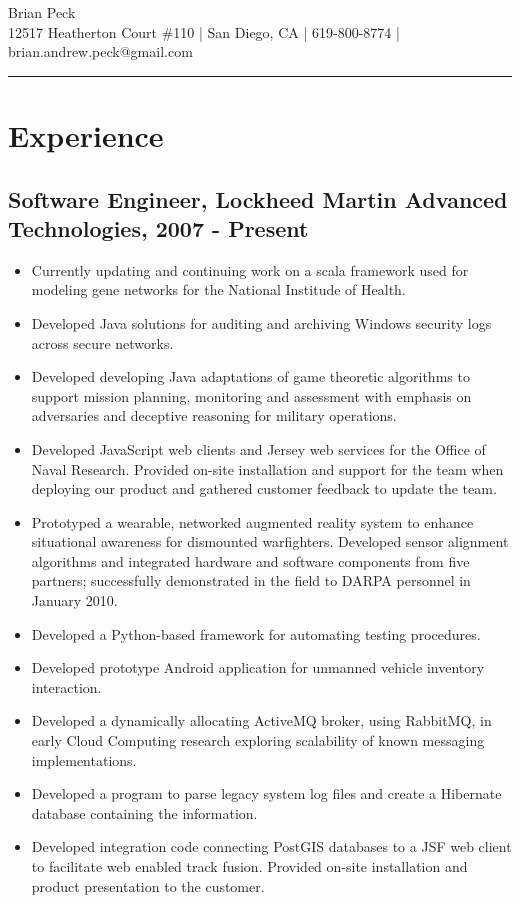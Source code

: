 \documentclass[11pt]{article}
\title{}
\date{}
\begin{document}
\begin{center}
{\huge Brian Peck} \\
12517 Heatherton Court \#110 | San Diego, CA | 619-800-8774 | brian.andrew.peck@gmail.com
\hrule
\end{center}

\section*{Experience}
\label{sec-1}

\subsection*{Software Engineer, Lockheed Martin Advanced Technologies, 2007 - Present}
\label{sec-1.1}

\begin{itemize}
\item Currently updating and continuing work on a scala framework used for modeling gene networks for the National Institude of Health.
\item Developed Java solutions for auditing and archiving Windows security logs across secure networks.
\item Developed developing Java adaptations of game theoretic algorithms to support mission planning, monitoring and assessment with emphasis on adversaries and deceptive reasoning for military operations.
\item Developed JavaScript web clients and Jersey web services for the Office of Naval Research. Provided on-site installation and support for the team when deploying our product and gathered customer feedback to update the team.
\item Prototyped a wearable, networked augmented reality system to enhance situational awareness for dismounted warfighters.  Developed sensor alignment algorithms and integrated hardware and software components from five partners; successfully demonstrated in the field to DARPA personnel in January 2010.
\item Developed a Python-based framework for automating testing procedures.
\item Developed prototype Android application for unmanned vehicle inventory interaction.
\item Developed a dynamically allocating ActiveMQ broker, using RabbitMQ, in early Cloud Computing research exploring scalability of known messaging implementations.
\item Developed a program to parse legacy system log files and create a Hibernate database containing the information.
\item Developed integration code connecting PostGIS databases to a JSF web client to facilitate web enabled track fusion. Provided on-site installation and product presentation to the customer.
\end{itemize}
\end{document}
